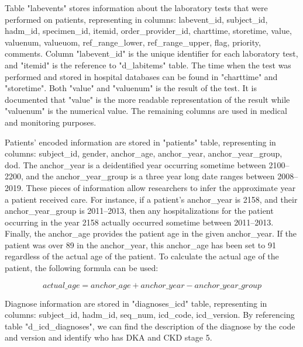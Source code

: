 \documentclass[../main.tex]{subfiles}
\begin{document}
Table "labevents" stores information about the laboratory tests that were performed on patients, representing in columns: labevent\_id, subject\_id, hadm\_id, specimen\_id, itemid, order\_provider\_id, charttime, storetime, value, valuenum, valueuom, ref\_range\_lower, ref\_range\_upper, flag, priority, comments.
Column "labevent\_id" is the unique identifier for each laboratory test, and "itemid" is the reference to "d\_labitems" table.
The time when the test was performed and stored in hospital databases can be found in "charttime" and "storetime".
Both "value" and "valuenum" is the result of the test. It is documented that "value" is the more readable representation of the result while "valuenum" is the numerical value.
The remaining columns are used in medical and monitoring purposes. 

Patients' encoded information are stored in "patients" table, representing in columns: subject\_id, gender, anchor\_age, anchor\_year, anchor\_year\_group, dod.
The anchor\_year is a deidentified year occurring sometime between 2100--2200, and the anchor\_year\_group is a three year long date ranges between 2008--2019. 
These pieces of information allow researchers to infer the approximate year a patient received care.
For instance, if a patient's anchor\_year is 2158, and their anchor\_year\_group is 2011--2013, then any hospitalizations for the patient occurring in the year 2158 actually occurred sometime between 2011--2013. 
Finally, the anchor\_age provides the patient age in the given anchor\_year. 
If the patient was over 89 in the anchor\_year, this anchor\_age has been set to 91 regardless of the actual age of the patient.
To calculate the actual age of the patient, the following formula can be used: 

\begin{equation}
    actual\_age = anchor\_age + anchor\_year - anchor\_year\_group
\end{equation}

Diagnose information are stored in "diagnoses\_icd" table, representing in columns: subject\_id, hadm\_id, seq\_num, icd\_code, icd\_version. 
By referencing table "d\_icd\_diagnoses", we can find the description of the diagnose by the code and version and identify who has DKA and CKD stage 5.


\end{document}
